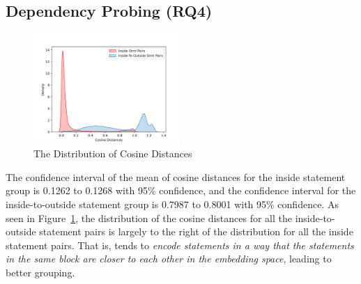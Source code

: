 \subsection{Dependency Probing (RQ4)}
\label{sec:rq4}

\begin{figure}[t]
 	\centering
 	\includegraphics[width=2.2in]{rq4-density.png}
        \vspace{-12pt}
 	\caption{The Distribution of Cosine Distances}
 	\label{fig:rq4-density}	
\end{figure}

The confidence interval of the mean of cosine distances for the inside
statement group is 0.1262 to 0.1268 with 95\% confidence, and the
confidence interval for the inside-to-outside statement group is
0.7987 to 0.8001 with 95\% confidence. As seen in
Figure~\ref{fig:rq4-density}, the distribution of the cosine distances
for all the inside-to-outside statement pairs is largely to the right
of the distribution for all the inside statement pairs. That is,
{\tool} tends to {\em encode statements in a way that the statements
  in the same  block are closer to each other in the
  embedding space}, leading to better grouping.


